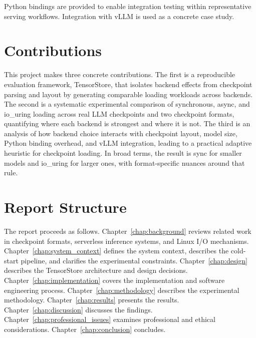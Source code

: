 Python bindings are provided to enable integration testing within representative serving workflows. Integration with vLLM is used as a concrete case study.

\section{Contributions}

This project makes three concrete contributions. The first is a reproducible evaluation framework, TensorStore, that isolates backend effects from checkpoint parsing and layout by generating comparable loading workloads across backends. The second is a systematic experimental comparison of synchronous, async, and io\_uring loading across real LLM checkpoints and two checkpoint formats, quantifying where each backend is strongest and where it is not. The third is an analysis of how backend choice interacts with checkpoint layout, model size, Python binding overhead, and vLLM integration, leading to a practical adaptive heuristic for checkpoint loading. In broad terms, the result is sync for smaller models and io\_uring for larger ones, with format-specific nuances around that rule.

\section{Report Structure}

The report proceeds as follows. Chapter~\ref{chap:background} reviews related work in checkpoint formats, serverless inference systems, and Linux I/O mechanisms. Chapter~\ref{chap:system_context} defines the system context, describes the cold-start pipeline, and clarifies the experimental constraints. Chapter~\ref{chap:design} describes the TensorStore architecture and design decisions. Chapter~\ref{chap:implementation} covers the implementation and software engineering process. Chapter~\ref{chap:methodology} describes the experimental methodology. Chapter~\ref{chap:results} presents the results. Chapter~\ref{chap:discussion} discusses the findings. Chapter~\ref{chap:professional_issues} examines professional and ethical considerations. Chapter~\ref{chap:conclusion} concludes.
